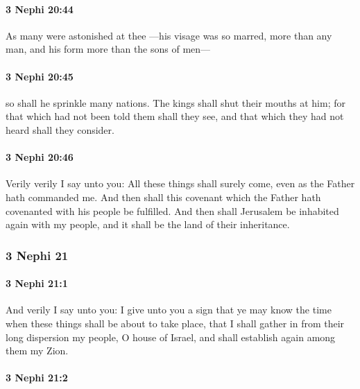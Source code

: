 		\paragraph{3 Nephi 20:44} %
			\label{3NEPHI-20-44}

			As many were astonished at thee
			---his visage was so marred, more than any man,
			and his form more than the sons of men---

		\paragraph{3 Nephi 20:45} %
			\label{3NEPHI-20-45}

			so shall he sprinkle many nations.
			The kings shall shut their mouths at him;
			for that which had not been told them shall they see,
			and that which they had not heard shall they consider.

		\paragraph{3 Nephi 20:46} %
			\label{3NEPHI-20-46}

			Verily verily I say unto you:
			All these things shall surely come,
			even as the Father hath commanded me.
			And then shall this covenant
			which the Father hath covenanted with his people
			be fulfilled.
			And then shall Jerusalem be inhabited again with my people,
			and it shall be the land of their inheritance.

	\subsubsection{3 Nephi 21} %
		\label{3NEPHI-21}
		
		\paragraph{3 Nephi 21:1} %
			\label{3NEPHI-21-1}

			And verily I say unto you:
			I give unto you a sign that ye may know the time
			when these things shall be about to take place,
			that I shall gather in from their long dispersion my people, O house of Israel,
			and shall establish again among them my Zion.

		\paragraph{3 Nephi 21:2} %
			\label{3NEPHI-21-2}


